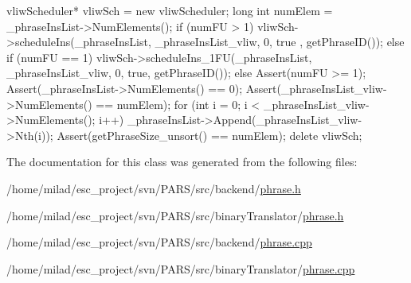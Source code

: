 \begin{DoxyCode}
                                            {
        vliwScheduler* vliwSch = new vliwScheduler;
        long int numElem = _phraseInsList->NumElements();
        if (numFU > 1) {
                vliwSch->scheduleIns(_phraseInsList, _phraseInsList_vliw, 0, true
      , getPhraseID());
        } else if (numFU == 1) {
                vliwSch->scheduleIns_1FU(_phraseInsList, _phraseInsList_vliw, 0, 
      true, getPhraseID());
        } else {
                Assert(numFU >= 1);
        }
        Assert(_phraseInsList->NumElements() == 0);
        Assert(_phraseInsList_vliw->NumElements() == numElem);
        for (int i = 0; i < _phraseInsList_vliw->NumElements(); i++) {
                _phraseInsList->Append(_phraseInsList_vliw->Nth(i));
        }
        Assert(getPhraseSize_unsort() == numElem);
        delete vliwSch;
}
\end{DoxyCode}


The documentation for this class was generated from the following files:\begin{DoxyCompactItemize}
\item 
/home/milad/esc\_\-project/svn/PARS/src/backend/\hyperlink{backend_2phrase_8h}{phrase.h}\item 
/home/milad/esc\_\-project/svn/PARS/src/binaryTranslator/\hyperlink{binaryTranslator_2phrase_8h}{phrase.h}\item 
/home/milad/esc\_\-project/svn/PARS/src/backend/\hyperlink{backend_2phrase_8cpp}{phrase.cpp}\item 
/home/milad/esc\_\-project/svn/PARS/src/binaryTranslator/\hyperlink{binaryTranslator_2phrase_8cpp}{phrase.cpp}\end{DoxyCompactItemize}
